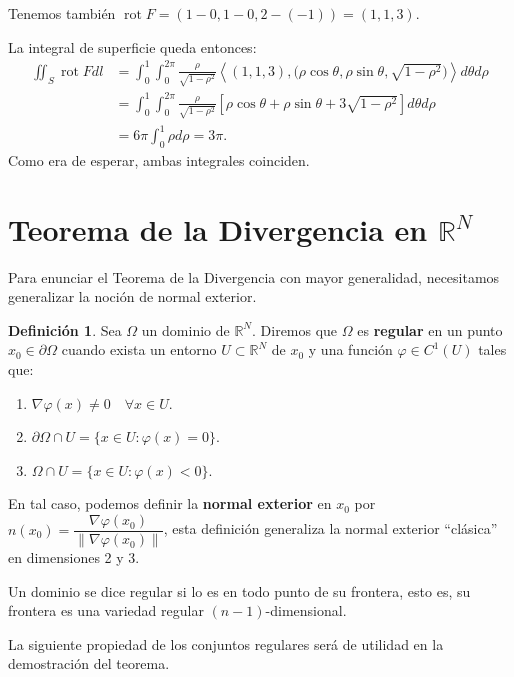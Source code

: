 \documentclass[12pt,spanish]{article}
\theoremstyle{definition}
\newtheorem{definition}[theorem]{Definici\'on}
\theoremstyle{remark}
\begin{document}
Tenemos también $\operatorname{rot} F=(1-0,1-0,2-(-1))=(1,1,3)$.

La integral de superficie queda entonces:
\begin{align*}
\iint_{S}\operatorname{rot} F dl&=\int_0^1\int_0^{2\pi}\frac{\rho}{\sqrt{1-\rho^2}}\left\langle(1,1,3),\big(\rho\cos \theta, \rho\sin\theta, \sqrt{1-\rho^2}\big)\right\rangle d\theta d\rho \\ 
&=\int_0^1\int_0^{2\pi}\frac{\rho}{\sqrt{1-\rho^2}}\left[\rho\cos\theta+\rho\sin\theta+3\sqrt{1-\rho^2} \right] d\theta d\rho \\
&= 6\pi\int_0^1 \rho d\rho=3\pi.
\end{align*}
Como era de esperar, ambas integrales coinciden.

\section{Teorema de la Divergencia en $\mathbb{R}^N$}

Para enunciar el Teorema de la Divergencia con mayor generalidad, necesitamos generalizar la noción de normal exterior. 

\begin{definition}
	Sea $\Omega$ un dominio de $\mathbb{R}^N$. Diremos que $\Omega$ es \textbf{regular} en un punto $x_0\in\partial\Omega$ cuando exista un entorno $U\subset\mathbb{R}^N$ de $x_0$ y una función $\varphi\in C^1(U)$ tales que:
	\begin{enumerate}[$(a)$]
		\item $\nabla \varphi(x)\neq 0\quad\forall x\in U$.
		\item $\partial\Omega\cap U=\{x\in U:\varphi(x)=0\}$.
		\item $\Omega\cap U=\{x\in U:\varphi(x)<0\}$.
	\end{enumerate}
En tal caso, podemos definir la \textbf{normal exterior} en $x_0$ por $n(x_0)=\dfrac{\nabla \varphi(x_0)}{\|\nabla \varphi(x_0)\|}$, esta definición generaliza la normal exterior ``clásica'' en dimensiones 2 y 3.

Un dominio se dice regular si lo es en todo punto de su frontera, esto es, su frontera es una variedad regular $(n-1)$-dimensional.
\end{definition}

La siguiente propiedad de los conjuntos regulares será de utilidad en la demostración del teorema.
\end{document}

